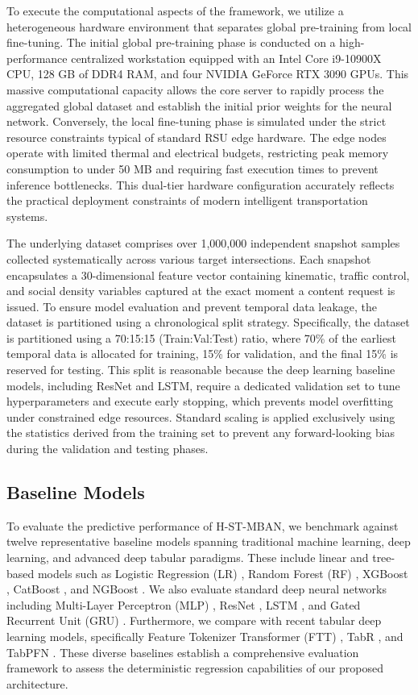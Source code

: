 \documentclass[journal]{IEEEtran}
\begin{document}
To execute the computational aspects of the framework, we utilize a heterogeneous hardware environment that separates global pre-training from local fine-tuning. The initial global pre-training phase is conducted on a high-performance centralized workstation equipped with an Intel Core i9-10900X CPU, 128 GB of DDR4 RAM, and four NVIDIA GeForce RTX 3090 GPUs. This massive computational capacity allows the core server to rapidly process the aggregated global dataset and establish the initial prior weights for the neural network. Conversely, the local fine-tuning phase is simulated under the strict resource constraints typical of standard RSU edge hardware. The edge nodes operate with limited thermal and electrical budgets, restricting peak memory consumption to under 50 MB and requiring fast execution times to prevent inference bottlenecks. This dual-tier hardware configuration accurately reflects the practical deployment constraints of modern intelligent transportation systems.

The underlying dataset comprises over 1,000,000 independent snapshot samples collected systematically across various target intersections. Each snapshot encapsulates a 30-dimensional feature vector containing kinematic, traffic control, and social density variables captured at the exact moment a content request is issued. To ensure model evaluation and prevent temporal data leakage, the dataset is partitioned using a chronological split strategy. Specifically, the dataset is partitioned using a 70:15:15 (Train:Val:Test) ratio, where 70\% of the earliest temporal data is allocated for training, 15\% for validation, and the final 15\% is reserved for testing. This split is reasonable because the deep learning baseline models, including ResNet and LSTM, require a dedicated validation set to tune hyperparameters and execute early stopping, which prevents model overfitting under constrained edge resources. Standard scaling is applied exclusively using the statistics derived from the training set to prevent any forward-looking bias during the validation and testing phases.

\subsection{Baseline Models}
To evaluate the predictive performance of H-ST-MBAN, we benchmark against twelve representative baseline models spanning traditional machine learning, deep learning, and advanced deep tabular paradigms. These include linear and tree-based models such as Logistic Regression (LR) \cite{cox1958}, Random Forest (RF) \cite{breiman2001}, XGBoost \cite{chen2016}, CatBoost \cite{prokhorenkova2018}, and NGBoost \cite{duan2020}. We also evaluate standard deep neural networks including Multi-Layer Perceptron (MLP) \cite{rumelhart1986}, ResNet \cite{he2016}, LSTM \cite{hochreiter1997}, and Gated Recurrent Unit (GRU) \cite{cho2014}. Furthermore, we compare with recent tabular deep learning models, specifically Feature Tokenizer Transformer (FTT) \cite{gorishniy2021}, TabR \cite{gorishniy2024}, and TabPFN \cite{hollmann2023}. These diverse baselines establish a comprehensive evaluation framework to assess the deterministic regression capabilities of our proposed architecture.
\end{document}
